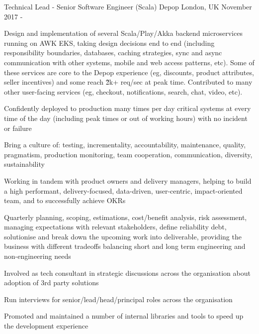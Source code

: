 \begin{cventries}
\cventry
  {Technical Lead - Senior Software Engineer (Scala)}
{Depop}
	{London, UK}
	{November 2017 - \present{}}
{%
\begin{cvitems} 
\item Design and implementation of several Scala/Play/Akka backend microservices running on AWK EKS, taking design decisions end to end (including responsibility boundaries, databases, caching strategies, sync and async communication with other systems, mobile and web access patterns, etc). Some of these services are core to the Depop experience (eg, discounts, product attributes, seller incentives) and some reach \~ 2k+ req/sec at peak time. 
  Contributed to many other user-facing services (eg, checkout, notifications, search, chat, video, etc). 
\item Confidently deployed to production many times per day critical systems at every time of the day (including peak times or out of working hours) with no incident or failure 
  \item Bring a culture of: testing, incrementality, accountability, maintenance, quality, pragmatism, production monitoring, team cooperation, communication, diversity, sustainability
\item Working in tandem with product owners and delivery managers, helping to build a high performant, delivery-focused, data-driven, user-centric, impact-oriented team, and to successfully achieve OKRs 
\item Quarterly planning, scoping, estimations, cost/benefit analysis, risk assessment, managing expectations with relevant stakeholders, define reliability debt, solutionise and break down the upcoming work into deliverable, providing the business with different tradeoffs balancing short and long term engineering and non-engineering needs 
\item Involved as tech consultant in strategic discussions across  the organisation about adoption of 3rd party solutions %
  \item Run interviews for senior/lead/head/principal roles across the organisation 
  \item Promoted and maintained a number of internal libraries and tools to speed up the development experience %

\end{cvitems}}
\end{cventries}
